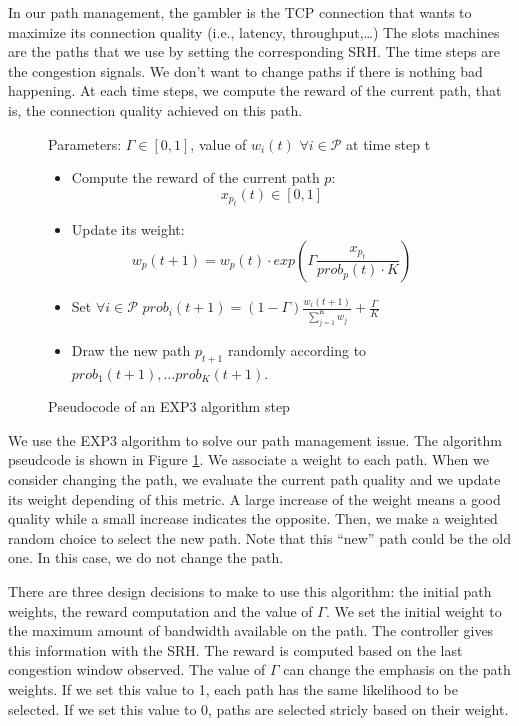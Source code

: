 In our path management, the gambler is the TCP connection that wants to maximize its connection quality
(i.e., latency, throughput,\dots)
The slots machines are the paths that we use by setting the corresponding SRH.
The time steps are the congestion signals. We don't want to change paths if there is nothing bad happening.
At each time steps, we compute the reward of the current path,
that is, the connection quality achieved on this path.

\begin{figure}
	\begin{framed}
		Parameters: $\Gamma \in [0, 1]$, value of $w_i(t)$ $\forall i \in \mathcal{P}$ at time step t
		\begin{itemize}
			\setlength{\itemsep}{0pt}
			\setlength{\parskip}{0pt}
			\item Compute the reward of the current path $p$: $$x_{p_t}(t) \in [0, 1]$$
			\item Update its weight: $$w_p(t+1) = w_p(t) \cdot exp(\Gamma \frac{x_{p_t}}{prob_p(t) \cdot K})$$
			\item Set $\forall i \in \mathcal{P}$ $prob_i(t+1) = (1 - \Gamma) \frac{w_i(t+1)}{\sum^K_{j=1}w_j} + \frac{\Gamma}{K}$
			\item Draw the new path $p_{t+1}$ randomly according to ${prob_1(t+1)},\dots {prob_K(t+1)}$.
		\end{itemize}
	\end{framed}
	\caption{Pseudocode of an EXP3 algorithm step}
	\label{algo:exp3}
\end{figure}

We use the EXP3 algorithm to solve our path management issue.
The algorithm pseudcode is shown in Figure \ref{algo:exp3}.
We associate a weight to each path. When we consider changing the path, we evaluate the current path quality
and we update its weight depending of this metric. A large increase of the weight means a good quality while
a small increase indicates the opposite.
Then, we make a weighted random choice to select the new path.
Note that this ``new'' path could be the old one. In this case, we do not change the path.

There are three design decisions to make to use this algorithm: the initial path weights, the reward computation and the value of $\Gamma$.
We set the initial weight to the maximum amount of bandwidth available on the path.
The controller gives this information with the SRH.
The reward is computed based on the last congestion window observed.
The value of $\Gamma$ can change the emphasis on the path weights.
If we set this value to 1, each path has the same likelihood to be selected.
If we set this value to 0, paths are selected stricly based on their weight.

